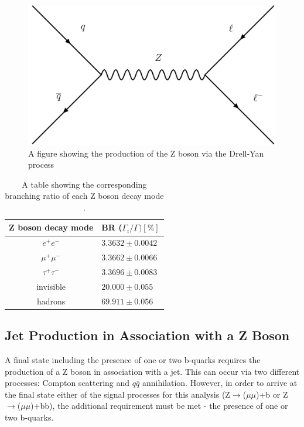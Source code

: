 \documentclass[12pt,a4paper,epsf,portrait,times,epsfig]{report}
\begin{document}
		\begin{figure}
			\centering
			\includegraphics[scale=0.1]{drell-yan.png}
			\caption{A figure showing the production of the Z boson via the Drell-Yan process}
			\label{Fig:DrellYan}
		\end{figure}

		\begin{table}
			\begin{center}
				\begin{tabular}{ c | l }
					\hline \hline
					Z boson decay mode & BR ($\Gamma_{i} / \Gamma) [\%]$ \\
					\hline
					$e^{+}e^{-}$ & $3.3632 \pm 0.0042$ \\
					\hline
					$\mu^{+}\mu^{-}$ & $3.3662 \pm 0.0066$ \\
					\hline
					$\tau^{+}\tau^{-}$ & $3.3696 \pm 0.0083$ \\
					\hline
					invisible & $20.000 \pm 0.055$ \\
					\hline
					hadrons & $69.911 \pm 0.056$ \\
					\hline \hline
				\end{tabular}
				\caption{A table showing the corresponding branching ratio of each Z boson decay mode \cite{Article:PDG2020}.}
				\label{tab:ZbosonBranchingRatio}
			\end{center}
		\end{table}

		\subsection{Jet Production in Association with a Z Boson}

		A final state including the presence of one or two b-quarks requires the production of a Z boson in association with a jet. This can occur via two different processes: Compton scattering and $q\overline{q}$ annihilation. However, in order to arrive at the final state either of the signal processes for this analysis (Z$\rightarrow$($\mu\mu$)+b or Z$\rightarrow$($\mu\mu$)+bb), the additional requirement must be met - the presence of one or two b-quarks. \par
		 
\end{document}
